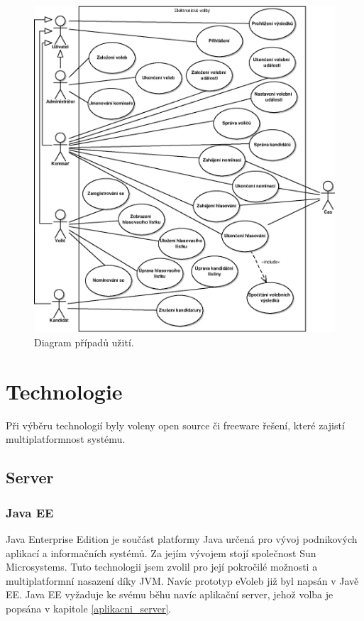\documentclass[11pt,twoside,a4paper]{book}
\begin{document}
\begin{figure}[h!]
	\centering
	\includegraphics[scale=0.9]{diagrams/pripady_uziti.eps}
	\caption{Diagram případů užití.}
	\label{fig:pripady_uziti}
\end{figure}


\section{Technologie}

Při výběru technologií byly voleny open source či freeware řešení, které zajistí multiplatformnost systému.

\subsection{Server}

\subsubsection{Java EE}

Java Enterprise Edition je součást platformy Java určená pro vývoj podnikových aplikací a informačních systémů. Za jejím vývojem stojí společnost Sun Microsystems. Tuto technologii jsem zvolil pro její pokročilé možnosti a multiplatformní nasazení díky JVM.  Navíc prototyp eVoleb již byl napsán v Javě EE. Java EE vyžaduje ke svému běhu navíc aplikační server, jehož volba je popsána v kapitole \ref{aplikacni_server}. 
\end{document}
